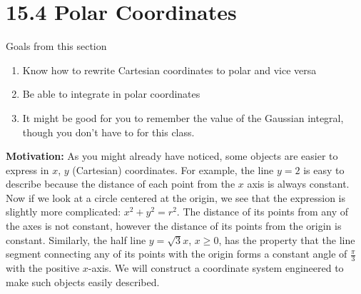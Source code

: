 \documentclass[12pt]{article}
\title{}
\begin{document}
\section*{15.4 Polar Coordinates}
Goals from this section
\begin{enumerate}
\item Know how to rewrite Cartesian coordinates to polar and vice versa
\item Be able to integrate in polar coordinates
\item It might be good for you to remember the value of the Gaussian integral, though you don't have to for this class.
\end{enumerate}
\textbf{Motivation: } As you might already have noticed, some objects are easier to express in $x$, $y$ (Cartesian) coordinates. For example, the line $y=2$ is easy to describe because the distance of each point from the $x$ axis is always constant. Now if we look at a circle centered at the origin, we see that the expression is slightly more complicated: $x^2+y^2=r^2$. The distance of its points from any of the axes is not constant, however the distance of its points from the origin is constant. Similarly, the half line $y=\sqrt{3}x$, $x\geq 0$, has the property that the line segment connecting any of its points with the origin forms a constant angle of $\frac{\pi}{3}$ with the positive $x$-axis. We will construct a coordinate system engineered to make such objects easily described.
\end{document}
